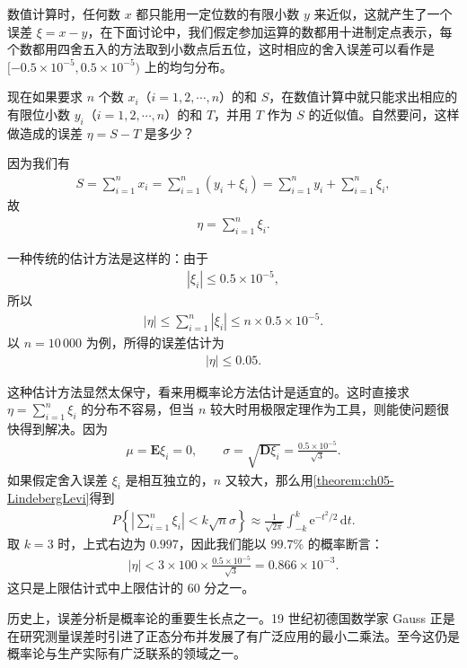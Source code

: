 \documentclass[../../main.tex]{subfiles}
\begin{document}
\begin{example}[近似数定点运算的误差分析]\label{example:ch05-误差分析}
数值计算时，任何数 $x$ 都只能用一定位数的有限小数 $y$ 来近似，这就产生了一个误差 $\xi=x-y$，在下面讨论中，我们假定参加运算的数都用十进制定点表示，每个数都用四舍五入的方法取到小数点后五位，这时相应的舍入误差可以看作是 $[-0.5\times10^{-5},0.5\times10^{-5})$ 上的均匀分布。

现在如果要求 $n$ 个数 $x_i$（$i=1,2,\cdots,n$）的和 $S$，在数值计算中就只能求出相应的有限位小数 $y_i$（$i=1,2,\cdots,n$）的和 $T$，并用 $T$ 作为 $S$ 的近似值。自然要问，这样做造成的误差 $\eta=S-T$ 是多少？

因为我们有
\begin{align*}
S=\sum_{i=1}^{n}x_i=\sum_{i=1}^{n}(y_i+\xi_i)=\sum_{i=1}^{n}y_i+\sum_{i=1}^{n}\xi_i,
\end{align*}
故
\begin{align*}
\eta=\sum_{i=1}^{n}\xi_i.
\end{align*}

一种传统的估计方法是这样的：由于
\begin{align*}
|\xi_i|\leqslant 0.5\times10^{-5},
\end{align*}
所以
\begin{align*}
|\eta|\leqslant\sum_{i=1}^{n}|\xi_i|\leqslant n\times0.5\times10^{-5}.
\end{align*}
以 $n=10\,000$ 为例，所得的误差估计为
\begin{align}
|\eta|\leqslant 0.05.
\end{align}

这种估计方法显然太保守，看来用概率论方法估计是适宜的。这时直接求 $\eta=\sum_{i=1}^{n}\xi_i$ 的分布不容易，但当 $n$ 较大时用极限定理作为工具，则能使问题很快得到解决。因为
\begin{align*}
\mu=\boldsymbol{E}\xi_i=0,\qquad \sigma=\sqrt{\boldsymbol{D}\xi_i}=\frac{0.5\times10^{-5}}{\sqrt{3}}.
\end{align*}
如果假定舍入误差 $\xi_i$ 是相互独立的，$n$ 又较大，那么用\cref{theorem:ch05-LindebergLevi}得到
\begin{align*}
P\!\left\{\left|\sum_{i=1}^{n}\xi_i\right|<k\sqrt{n}\sigma\right\}\approx\frac{1}{\sqrt{2\pi}}\int_{-k}^{k}\mathrm{e}^{-t^{2}/2}\,\mathrm{d}t.
\end{align*}
取 $k=3$ 时，上式右边为 $0.997$，因此我们能以 $99.7\%$ 的概率断言：
\begin{align}
|\eta|<3\times100\times\frac{0.5\times10^{-5}}{\sqrt{3}}=0.866\times10^{-3}.
\end{align}
这只是上限估计式中上限估计的 $60$ 分之一。

历史上，误差分析是概率论的重要生长点之一。19 世纪初德国数学家 Gauss 正是在研究测量误差时引进了正态分布并发展了有广泛应用的最小二乘法。至今这仍是概率论与生产实际有广泛联系的领域之一。
\end{example}
\end{document}
